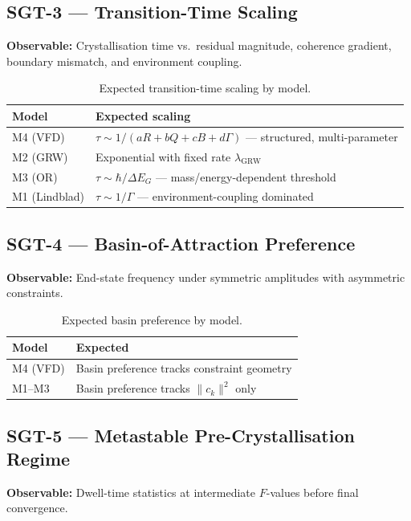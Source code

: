 \documentclass[12pt]{article}
\begin{document}
\subsection{SGT-3 --- Transition-Time Scaling}

\textbf{Observable:} Crystallisation time vs.\ residual magnitude, coherence gradient, boundary mismatch, and environment coupling.

\begin{table}[ht]
\centering
\caption{Expected transition-time scaling by model.}
\begin{tabular}{@{}lp{8cm}@{}}
\toprule
Model & Expected scaling \\
\midrule
M4 (VFD) & $\tau \sim 1/(aR + bQ + cB + d\Gamma)$ --- structured, multi-parameter \\
M2 (GRW) & Exponential with fixed rate $\lambda_{\mathrm{GRW}}$ \\
M3 (OR) & $\tau \sim \hbar/\Delta E_G$ --- mass/energy-dependent threshold \\
M1 (Lindblad) & $\tau \sim 1/\Gamma$ --- environment-coupling dominated \\
\bottomrule
\end{tabular}
\end{table}

\subsection{SGT-4 --- Basin-of-Attraction Preference}

\textbf{Observable:} End-state frequency under symmetric amplitudes with asymmetric constraints.

\begin{table}[ht]
\centering
\caption{Expected basin preference by model.}
\begin{tabular}{@{}ll@{}}
\toprule
Model & Expected \\
\midrule
M4 (VFD) & Basin preference tracks constraint geometry \\
M1--M3 & Basin preference tracks $\|c_k\|^2$ only \\
\bottomrule
\end{tabular}
\end{table}

\subsection{SGT-5 --- Metastable Pre-Crystallisation Regime}

\textbf{Observable:} Dwell-time statistics at intermediate $F$-values before final convergence.
\end{document}
